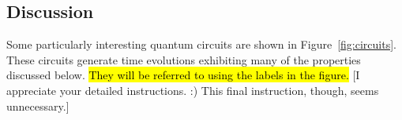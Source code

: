 \documentclass[11pt]{article}
\newcommand{\nicole}[1]{{\color{Green}#1}}
\begin{document}
\begin{multicols}{2}
\section*{Discussion}
Some particularly interesting quantum circuits are shown in Figure~\ref{fig:circuits}. These circuits generate time evolutions exhibiting many of the properties discussed below. 
\hl{They will be referred to using the labels in the figure.} 
\nicole{[I appreciate your detailed instructions. :) This final instruction, though, seems unnecessary.]}

\hspace{1cm}\\
\hspace{1cm}\\
\hspace{1cm}\\




\end{multicols}
\end{document}

